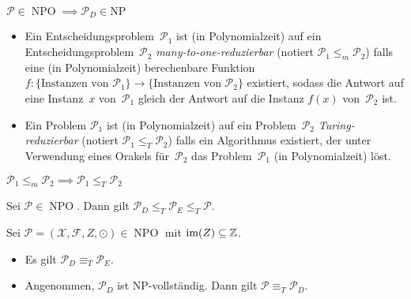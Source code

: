\documentclass{cheat-sheet}
\newcommand{\Instances}{\mathcal{X}} %
\newcommand{\Feasible}{\mathcal{F}} %
\newcommand{\ObjFun}{Z} %
\newcommand{\Goal}{\odot} %
\newcommand{\OptTuple}{(\Instances{}, \Feasible{}, \ObjFun{}, \Goal)} %
\DeclareMathOperator{\NPO}{NPO} %
\newcommand{\Prob}{\mathcal{P}} %
\newcommand{\ManyOneRed}{\leq_m} %
\newcommand{\TuringRed}{\leq_T} %
\newcommand{\TuringEq}{\equiv_T} %
\begin{document}
\begin{lem}
  $\Prob \in \NPO \implies \Prob_D \in \mathrm{NP}$
\end{lem}

\begin{defn}
  \begin{itemize}
    \item Ein Entscheidungsproblem~$\Prob_1$ ist (in Polynomialzeit) auf ein Entscheidungsproblem~$\Prob_2$ \emph{many-to-one-reduzierbar} (notiert $\Prob_1 \ManyOneRed \Prob_2$) falls eine (in Polynomialzeit) berechenbare Funktion $f : \{ \text{Instanzen von~$\Prob_1$} \} \to \{ \text{Instanzen von~$\Prob_2$} \}$ existiert, sodass die Antwort auf eine Instanz~$x$ von~$\Prob_1$ gleich der Antwort auf die Instanz $f(x)$ von~$\Prob_2$ ist.
    \item Ein Problem $\Prob_1$ ist (in Polynomialzeit) auf ein Problem~$\Prob_2$ \emph{Turing-reduzierbar} (notiert $\Prob_1 \TuringRed \Prob_2$) falls ein Algorithmus existiert, der unter Verwendung eines Orakels für~$\Prob_2$ das Problem~$\Prob_1$ (in Polynomialzeit) löst.
  \end{itemize}
\end{defn}

\begin{beob}
  $
    \Prob_1 \ManyOneRed \Prob_2 \implies
    \Prob_1 \TuringRed \Prob_2
  $
\end{beob}

\begin{beob}
  Sei $\Prob \in \NPO$.
  Dann gilt $\Prob_D \TuringRed \Prob_E \TuringRed \Prob$.
\end{beob}

\begin{satz}
  Sei $\Prob = \OptTuple \in \NPO$ mit $\operatorname{im}(Z) \subseteq \mathbb{Z}$.
  \begin{itemize}
    \item Es gilt $\Prob_D \TuringEq \Prob_E$.
    \item Angenommen, $\Prob_D$ ist NP-vollständig. Dann gilt $\Prob \TuringEq \Prob_D$.
  \end{itemize}
\end{satz}
\end{document}
